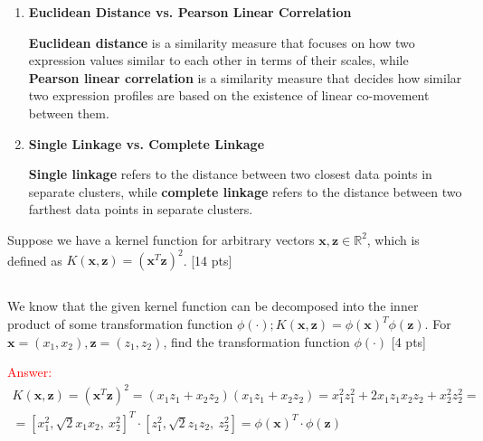 \documentclass{homework}
\begin{document}
\begin{enumerate}
        \item \textbf{Euclidean Distance vs. Pearson Linear Correlation}
        
        \textbf{Euclidean distance} is a similarity measure that focuses on how two expression values similar to each other in terms of their scales, while \textbf{Pearson linear correlation} is a similarity measure that decides how similar two expression profiles are based on the existence of linear co-movement between them.
        
        \item \textbf{Single Linkage vs. Complete Linkage}
        
        \textbf{Single linkage} refers to the distance between two closest data points in separate clusters, while \textbf{complete linkage} refers to the distance between two farthest data points in separate clusters.
        
        
        
        
    \end{enumerate}
    \vspace{10mm}
    
    
    \exercise*
    Suppose we have a kernel function for arbitrary vectors $\mathbf{x},\mathbf{z}\in \mathbb{R}^2$, which is defined as $K(\mathbf{x},\mathbf{z})=(\mathbf{x}^T \mathbf{z})^2$. [14 pts]
    
    
    \subsection{}
    We know that the given kernel function can be decomposed into the inner product of some transformation function $\phi(\cdot);K(\mathbf{x},\mathbf{z})=\phi(\mathbf{x})^T \phi(\mathbf{z}).$ For $\mathbf{x}= (x_1,x_2),\mathbf{z}= (z_1,z_2)$, find the transformation function $\phi(\cdot)$ [4 pts]
    
    \textcolor{red}{Answer:}
    \begin{equation*}
    \begin{gathered}
        K(\mathbf{x},\mathbf{z}) = (\mathbf{x}^T \mathbf{z})^2 = (x_1z_1 +
        x_2z_2)(x_1z_1 + x_2z_2) = x_1^2z_1^2 + 2x_1z_1x_2z_2 + x_2^2z_2^2 = \\
        = \left[x_1^2, \sqrt{2}x_1x_2,\ x_2^2\right]^T \cdot \left[ z_1^2, \sqrt{2}z_1z_2,\ z_2^2\right] = \phi(\mathbf{x})^T \cdot \phi(\mathbf{z})   
    \end{gathered}
    \end{equation*}
    
\end{document}
